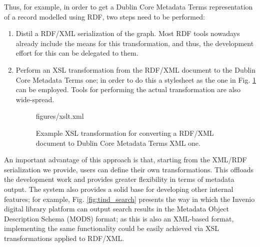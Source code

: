 Thus, for example, in order to get a Dublin Core Metadata Terms representation of a record modelled using RDF, two steps need to be performed:
\begin{enumerate}
\item Distil a RDF/XML serialization of the graph. Most RDF tools nowadays already include the means for this transformation, and thus, the development effort for this can be delegated to them.
\item Perform an XSL transformation from the RDF/XML document to the Dublin Core Metadata Terms one; in order to do this a stylesheet as the one in Fig. \ref{lst:xslt} can be employed. Tools for performing the actual transformation are also wide-spread.

\begin{figure}[!ht]

  {figures/xslt.xml}
  \caption{Example XSL transformation for converting a RDF/XML document to Dublin Core Metadata Terms XML one.}
  \label{lst:xslt}
\end{figure}
\end{enumerate}

An important advantage of this approach is that, starting from the XML/RDF serialization we provide, users can define their own transformations. This offloads the development work and
provides greater flexibility in terms of metadata output. The system also provides a solid
base for developing other internal features; for example, Fig. \ref{fig:tind_search} presents the way in which the Invenio digital library platform \cite{invenio} can output search results in the Metadata Object Description Schema (MODS) format; as this is also
an XML-based format, implementing the same functionality could be easily achieved via XSL transformations applied to RDF/XML.

